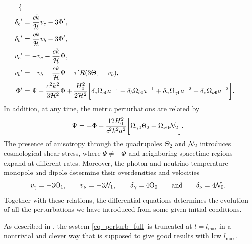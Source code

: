 \documentclass[10pt,a4paper]{article}
\begin{document}
\begin{subequations}
\begin{align}
\begin{dcases}
	                       \end{dcases} \\
	{\delta_c}^\prime   &= \frac{ck}{\mathcal{H}} v_c - 3 \Phi^\prime , \\
	{\delta_b}^\prime   &= \frac{ck}{\mathcal{H}} v_b - 3 \Phi^\prime , \\
	{v_c}^\prime        &= -v_c - \frac{ck}{\mathcal{H}} \Psi , \\
	{v_b}^\prime        &= -v_b - \frac{ck}{\mathcal{H}} \Psi + \tau^\prime R (3\Theta_1 + v_b), \\
	{\Phi}^\prime       &= \Psi - \frac{c^2 k^2}{3 \mathcal{H}^2} \Phi + \frac{H_0^2}{2 \mathcal{H}^2} \bigg[ \delta_c \Omega_{c0} a^{-1} + \delta_b \Omega_{b0} a^{-1} + \delta_\gamma \Omega_{\gamma 0} a^{-2} + \delta_\nu \Omega_{\nu 0} a^{-2} \bigg] .
\end{align}
\label{eq_perturb_full}
\end{subequations}
In addition, at any time, the metric perturbations are related by
\begin{equation}
	\Psi  = -\Phi - \frac{12 H_0^2}{c^2 k^2 a^2} \bigg[ \Omega_{\gamma 0} \Theta_2 + \Omega_{\nu 0} \mathcal{N}_2 \bigg] .
\label{eq_potential_relation}
\end{equation}
The presence of anisotropy through the quadrupoles $\Theta_2$ and $\mathcal{N}_2$ introduces cosmological shear stress,
where $\Psi \neq -\Phi$ and neighboring spacetime regions expand at different rates.
Moreover, the photon and neutrino temperature monopole and dipole determine their overdensities and velocities
\begin{equation}
	v_\gamma = -3\Theta_1, \qquad
	v_\nu = -3\mathcal{N}_1, \qquad
	\delta_\gamma = 4\Theta_0 \qquad \text{and} \qquad
	\delta_\nu = 4\mathcal{N}_0.
\label{eq_radiation_velocity_overdensity}
\end{equation}
Together with these relations, the differential equations determines the evolution of all the perturbations we have introduced from some given initial conditions.

As described in \cite[section V.A.]{callinHowCalculateCMB2006},
the system \eqref{eq_perturb_full} is truncated at $l=l_\text{max}$
in a nontrivial and clever way that is supposed to give good results with low $l_\text{max}$.
\end{document}
